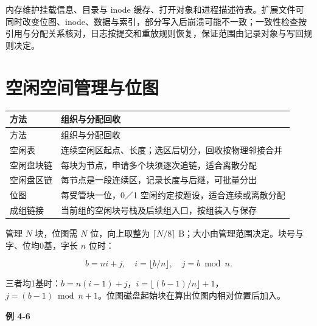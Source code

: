 内存维护挂载信息、目录与 inode 缓存、打开对象和进程描述符表。扩展文件可同时改变位图、inode、数据与索引，部分写入后崩溃可能不一致；一致性检查按引用与分配关系核对，日志按提交和重放规则恢复，保证范围由记录对象与写回规则决定。

\section{空闲空间管理与位图}\label{OS04-free-space}

\par\smallskip
{\fontsize{9.3}{12}\selectfont\setlength{\tabcolsep}{2.5pt}\setlength{\LTleft}{0pt}\setlength{\LTright}{0pt}
\begin{longtable}{@{}>{\raggedright\arraybackslash}p{}>{\raggedright\arraybackslash}p{}@{}}
\toprule
方法 & 组织与分配回收 \\

\midrule\endfirsthead\toprule
方法 & 组织与分配回收 \\

\midrule\endhead\bottomrule\endfoot
空闲表 & 连续空闲区起点、长度；选区后切分，回收按物理邻接合并 \\

空闲盘块链 & 每块为节点，申请多个块须逐次追链，适合离散分配 \\

空闲盘区链 & 每节点是一段连续区，记录长度与后继，可批量分出 \\

位图 & 每受管块一位，0／1 空闲约定按题设，适合连续或离散分配 \\

成组链接 & 当前组的空闲块号栈及后续组入口，按组装入与保存 \\

\end{longtable}}
\par\smallskip

管理 \(N\) 块，位图需 \(N\) 位，向上取整为 \(\lceil N/8\rceil\) B；大小由管理范围决定。块号与字、位均0基，字长 \(n\) 位时：

\[b=ni+j,\quad i=\lfloor b/n\rfloor,\quad j=b\bmod n.\]

三者均1基时：\(b=n(i-1)+j\)，\(i=\lfloor(b-1)/n\rfloor+1\)，\(j=(b-1)\bmod n+1\)。位图磁盘起始块在算出位图内相对位置后加入。

\par\medskip{}\noindent\hypertarget{OS04-E06}{}\label{OS04-E06}\textbf{例 4-6}\par\nobreak\smallskip

